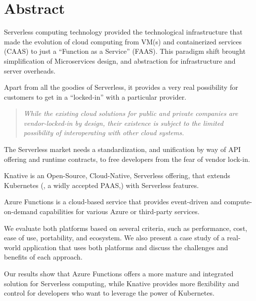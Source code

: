 \documentclass{article}
\begin{document}
\section{Abstract}
\begin{flushleft}
Serverless computing technology provided the technological infrastructure that made the evolution of cloud computing from \gls{VM}(s) and containerized services (\gls{CAAS}) to just a “Function as a Service” (\gls{FAAS}). This paradigm shift brought simplification of Microservices design, and abstraction for infrastructure and server overheads.

Apart from all the goodies of Serverless, it provides a very real possibility for customers to get in a “locked-in” with a particular provider. 

\begin{quote}
    \textit{While the existing cloud solutions for public and private companies are vendor-locked-in by design, their existence is subject to the limited possibility of interoperating with other cloud systems.}\\
    \cite{Opara-Martins-2014} 
\end{quote}

The Serverless market needs a standardization, and unification by way of API offering and runtime contracts, to free developers from the fear of vendor lock-in. 

Knative is an Open-Source, Cloud-Native, Serverless offering, that extends Kubernetes (, a widly accepted \gls{PAAS},) with Serverless features. 

Azure Functions is a cloud-based service that provides event-driven and compute-on-demand capabilities for various Azure or third-party services. 

We evaluate both platforms based on several criteria, such as performance, cost, ease of use, portability, and ecosystem. We also present a case study of a real-world application that uses both platforms and discuss the challenges and benefits of each approach. 

Our results show that Azure Functions offers a more mature and integrated solution for Serverless computing, while Knative provides more flexibility and control for developers who want to leverage the power of Kubernetes.
\end{flushleft}

\pagebreak
\end{document}
